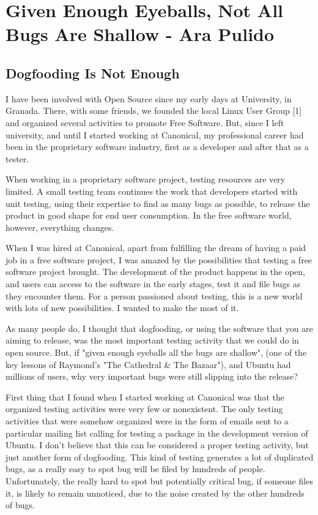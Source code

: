 \chapter{Given Enough Eyeballs, Not All Bugs Are Shallow - Ara Pulido}
\section*{Dogfooding Is Not Enough} 

I have been involved with Open Source since my early days at University, in Granada. There, with some friends, we founded the local Linux User Group [1] and organized several activities to promote Free Software. But, since I left university, and until I started working at Canonical, my professional career had been in the proprietary software industry, first as a developer and after that as a tester.

When working in a proprietary software project, testing resources are very limited. A small testing team continues the work that developers started with unit testing, using their expertise to find as many bugs as possible, to release the product in good shape for end user consumption. In the free software world, however, everything changes.

When I was hired at Canonical, apart from fulfilling the dream of having a paid job in a free software project, I was amazed by the possibilities that testing a free software project brought. The development of the product happens in the open, and users can access to the software in the early stages, test it and file bugs as they encounter them. For a person passioned about testing, this is a new world with lots of new possibilities. I wanted to make the most of it.

As many people do, I thought that dogfooding, or using the software that you are aiming to release, was the most important testing activity that we could do in open source. But, if "given enough eyeballs all the bugs are shallow", (one of the key lessons of Raymond's "The Cathedral \& The Bazaar"), and Ubuntu had millions of users, why very important bugs were still slipping into the release?

First thing that I found when I started working at Canonical was that the organized testing activities were very few or nonexistent. The only testing activities that were somehow organized were in the form of emails sent to a particular mailing list calling for testing a package in the development version of Ubuntu. I don't believe that this can be considered a proper testing activity, but just another form of dogfooding. This kind of testing generates a lot of duplicated bugs, as a really easy to spot bug will be filed by hundreds of people. Unfortunately, the really hard to spot but potentially critical bug, if someone files it, is likely to remain unnoticed, due to the noise created by the other hundreds of bugs.

